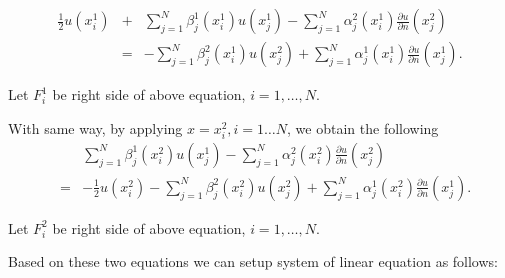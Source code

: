 \begin{eqnarray}
\frac{1}{2} u(x_i^1) &+& \sum_{j=1}^N \beta_j^1(x_i^1)u(x_j^1) -
\sum_{j=1}^N\alpha^2_j(x_i^1)\frac{\partial u}{\partial n}(x_j^2)
\\
&=& -\sum_{j=1}^N\beta_j^2(x_i^1)u(x_j^2) + \sum_{j=1}^N
\alpha^1_j(x_i^1)\frac{\partial u}{\partial n}(x_j^1).
\end{eqnarray}

Let $F_i^1$ be right side of above equation, $i=1,\dots,N$.

 With same way, by applying $x = x^2_i, i=1\dots
N$, we obtain the following
\begin{eqnarray}
&&\sum_{j=1}^N \beta_j^1(x_i^2)u(x_j^1) - \sum_{j=1}^N
\alpha^2_j(x_i^2)\frac{\partial u}{\partial n}(x_j^2)
\\
&=& - \frac{1}{2} u(x_i^2) -\sum_{j=1}^N\beta_j^2(x_i^2)u(x_j^2) +
\sum_{j=1}^N \alpha^1_j(x_i^2)\frac{\partial u}{\partial
n}(x_j^1).
\end{eqnarray}

Let $F_i^2$ be right side of above equation, $i=1,\dots,N$.

Based on these two equations we can setup system of linear
equation as follows:


